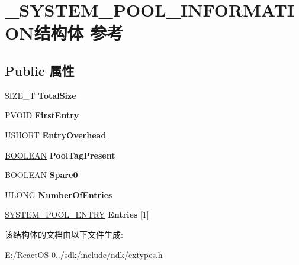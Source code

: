 \hypertarget{struct___s_y_s_t_e_m___p_o_o_l___i_n_f_o_r_m_a_t_i_o_n}{}\section{\+\_\+\+S\+Y\+S\+T\+E\+M\+\_\+\+P\+O\+O\+L\+\_\+\+I\+N\+F\+O\+R\+M\+A\+T\+I\+O\+N结构体 参考}
\label{struct___s_y_s_t_e_m___p_o_o_l___i_n_f_o_r_m_a_t_i_o_n}
\subsection*{Public 属性}
\begin{DoxyCompactItemize}
\item 
\mbox{\label{struct___s_y_s_t_e_m___p_o_o_l___i_n_f_o_r_m_a_t_i_o_n_afc608c15ced1a9418cbddeaaf6af71a8}} 
S\+I\+Z\+E\+\_\+T {\bfseries Total\+Size}
\item 
\mbox{\label{struct___s_y_s_t_e_m___p_o_o_l___i_n_f_o_r_m_a_t_i_o_n_a633cf18246352f507910aba1e1fa30b2}} 
\hyperlink{interfacevoid}{P\+V\+O\+ID} {\bfseries First\+Entry}
\item 
\mbox{\label{struct___s_y_s_t_e_m___p_o_o_l___i_n_f_o_r_m_a_t_i_o_n_a7ef0e66d13a1fc64db1b7b643e2a9972}} 
U\+S\+H\+O\+RT {\bfseries Entry\+Overhead}
\item 
\mbox{\label{struct___s_y_s_t_e_m___p_o_o_l___i_n_f_o_r_m_a_t_i_o_n_aa617cbfdca7dc7149b87f1322874527d}} 
\hyperlink{_processor_bind_8h_a112e3146cb38b6ee95e64d85842e380a}{B\+O\+O\+L\+E\+AN} {\bfseries Pool\+Tag\+Present}
\item 
\mbox{\label{struct___s_y_s_t_e_m___p_o_o_l___i_n_f_o_r_m_a_t_i_o_n_a1c3a955c33eb33b1f899565ca7eb5ef7}} 
\hyperlink{_processor_bind_8h_a112e3146cb38b6ee95e64d85842e380a}{B\+O\+O\+L\+E\+AN} {\bfseries Spare0}
\item 
\mbox{\label{struct___s_y_s_t_e_m___p_o_o_l___i_n_f_o_r_m_a_t_i_o_n_af2dc105e19c05fea50f01f3094706535}} 
U\+L\+O\+NG {\bfseries Number\+Of\+Entries}
\item 
\mbox{\label{struct___s_y_s_t_e_m___p_o_o_l___i_n_f_o_r_m_a_t_i_o_n_ad5955bda26b196fcdb225fa2e6964f90}} 
\hyperlink{struct___s_y_s_t_e_m___p_o_o_l___e_n_t_r_y}{S\+Y\+S\+T\+E\+M\+\_\+\+P\+O\+O\+L\+\_\+\+E\+N\+T\+RY} {\bfseries Entries} \mbox{[}1\mbox{]}
\end{DoxyCompactItemize}


该结构体的文档由以下文件生成\+:\begin{DoxyCompactItemize}
\item 
E\+:/\+React\+O\+S-\/0../sdk/include/ndk/extypes.\+h\end{DoxyCompactItemize}
